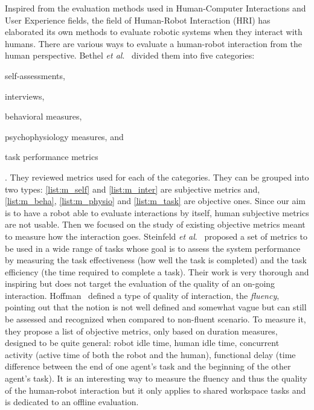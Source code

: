 \documentclass[a4paper,11pt,twoside]{StyleThese}
\begin{document}
Inspired from the evaluation methods used in Human-Computer Interactions and User Experience fields, the field of Human-Robot Interaction (HRI) has elaborated its own methods to evaluate robotic systems when they interact with humans. There are various ways to evaluate a human-robot interaction from the human perspective. Bethel \textit{et al}.~\cite{bethel_2010_review} divided them into five categories: \begin{enumerate*}[label={(\arabic*)}]
	\item self-assessments,\label{list:m_self}
	\item interviews,\label{list:m_inter}
	\item behavioral measures,\label{list:m_beha}
	\item psychophysiology measures, and\label{list:m_physio}
	\item task performance metrics\label{list:m_task}
\end{enumerate*}. They reviewed metrics used for each of the categories. They can be grouped into two types: \ref{list:m_self} and \ref{list:m_inter} are subjective metrics and, \ref{list:m_beha}, \ref{list:m_physio} and \ref{list:m_task} are objective ones. Since our aim is to have a robot able to evaluate interactions by itself, human subjective metrics are not usable. Then we focused on the study of existing objective metrics meant to measure how the interaction goes. Steinfeld \textit{et al}.~\cite{steinfeld_2006_common} proposed a set of metrics to be used in a wide range of tasks whose goal is to assess the system performance by measuring the task effectiveness (\ie how well the task is completed) and the task efficiency (\ie the time required to complete a task). Their work is very thorough and inspiring but does not target the evaluation of the quality of an on-going interaction. 
Hoffman~\cite{hoffman2019} defined a type of quality of interaction, the \textit{fluency}, pointing out that the notion is not well defined and somewhat vague but can still be assessed and recognized when compared to non-fluent scenario. To measure it, they propose a list of objective metrics, only based on duration measures, designed to be quite general: robot idle time, human idle time, concurrent activity (\ie active time of both the robot and the human), functional delay (\ie time difference between the end of one agent’s task and the beginning of the other agent’s task). It is an interesting way to measure the fluency and thus the quality of the human-robot interaction but it only applies to shared workspace tasks and is dedicated to an offline evaluation.
\end{document}
